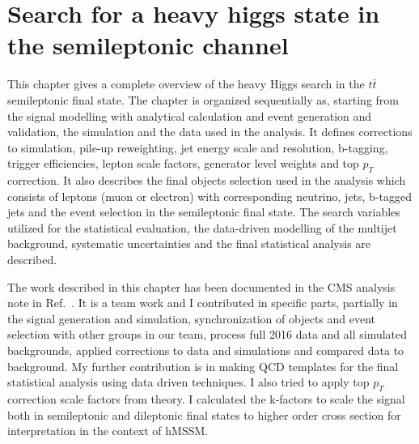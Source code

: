\graphicspath{{chapt_dutch/}{intro/}{chapt2/}{chapt3/}{chapt4/}{chapt5/}{chapt6/}{chapt7/}{chapt8/}}

\renewcommand\evenpagerightmark{{\scshape\small Chapter 6}}
\renewcommand\oddpageleftmark{{\scshape\small Search for a heavy higgs state in the semileptonic channel}}

\hyphenation{}

\chapter[Search for a heavy higgs state in the semileptonic channel]%
{Search for a heavy higgs state in the semileptonic channel}\label{Research_str_meth}
This chapter gives a complete overview of the heavy Higgs search in the $t\bar t$ semileptonic final state. The chapter is organized sequentially as, starting from the signal modelling with analytical calculation and event generation and validation, the simulation and the data used in the analysis. It defines corrections to simulation, pile-up reweighting, jet energy scale and resolution, b-tagging, trigger efficiencies, lepton scale factors, generator level weights and top $p_T$ correction. It also describes the final objects selection used in the analysis which consists of leptons (muon or electron) with corresponding neutrino, jets, b-tagged jets and the event selection in the semileptonic final state. The search variables utilized for the statistical evaluation, the data-driven modelling of the multijet background, systematic uncertainties and the final statistical analysis are described. 
  
The work described in this chapter has been documented in the CMS analysis note in Ref.~\cite{CMS-AN-16-272}. It is a team work and I contributed in specific parts, partially in the signal generation and simulation, synchronization of objects and event selection with other groups in our team, process full 2016 data and all simulated backgrounds, applied corrections to data and simulations and compared data to background. My further contribution is in making QCD templates for the final statistical analysis using data driven techniques. I also tried to apply top $p_{T}$ correction scale factors from theory. I calculated the k-factors to scale the signal both in semileptonic and dileptonic final states to higher order cross section for interpretation in the context of hMSSM. 

